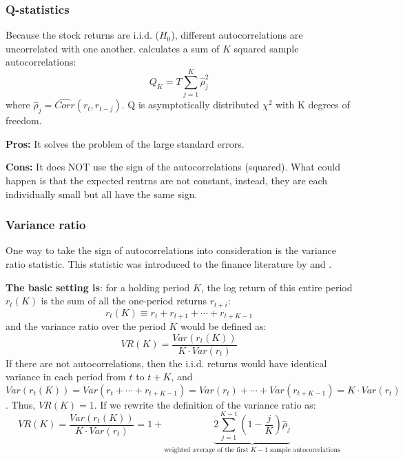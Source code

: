 \subsubsection{Q-statistics}
Because the stock returns are i.i.d. ($H_0$), different autocorrelations are uncorrelated with one another.
\citet{box1970distribution} calculates a sum of $K$ squared sample autocorrelations:
\begin{equation}
    Q_K = T\sum^K_{j=1}\hat{\rho}^2_j
\end{equation}
where $\hat{\rho}_j=\hat{Corr}(r_t,r_{t-j})$. Q is asymptotically distributed $\chi^2$ with K degrees of freedom.

\textbf{Pros:} It solves the problem of the large standard errors.

\textbf{Cons:} It does NOT use the sign of the autocorrelations (squared). What could happen is that the expected reutrns are
not constant, instead, they are each individually small but all have the same sign.

\subsubsection{Variance ratio}
One way to take the sign of autocorrelations into consideration is the variance ratio statistic.
This statistic was introduced to the finance literature by \citet{lo1988stock} and \citet{poterba1988mean}.

\textbf{The basic setting is}: for a holding period $K$, the log return of this entire period $r_t(K)$ is the sum of all the one-period returns $r_{t+i}$:
$$
r_t(K) \equiv r_t + r_{t+1} + \cdots + r_{t+K-1}
$$
and the variance ratio over the period $K$ would be defined as:
$$
    VR(K) = \frac{Var(r_t(K))}{K\cdot Var(r_{t})}
$$
If there are not autocorrelations, then the i.i.d. returns would have identical variance in each period from $t$ to $t+K$,
and $Var(r_t(K)) = Var(r_t+\cdots+r_{t+K-1})=Var(r_t)+\cdots+Var(r_{t+K-1})=K\cdot Var(r_t)$. Thus, $VR(K)=1$. If we rewrite
the definition of the variance ratio as:
\begin{equation}\label{eq1.3}
    VR(K) = \frac{Var(r_t(K))}{K\cdot Var(r_{t})} = 1+\underbrace{2\sum^{K-1}_{j=1}\left(1-\frac{j}{K}\right)\hat{\rho}_j}_{\text{weighted average of the first $K-1$ sample autocorrelations}}
\end{equation}

